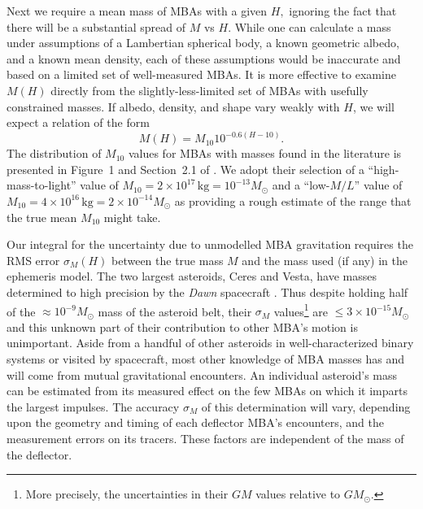 \documentclass[linenumbers, onecolumn]{aastex631}
\newcommand\edited[1]{{\color{red} {#1}}}
\begin{document}
\edited{Next we require a mean mass of MBAs with a given $H,$ ignoring the fact
  that there will be a substantial spread of $M$ vs $H$.  While one can
  calculate a mass under assumptions of a Lambertian spherical body, a known
  geometric albedo, and a known mean density, each of these assumptions would be
  inaccurate and based on a limited set of well-measured MBAs.  It is more
  effective to examine $M(H)$ directly from the slightly-less-limited set of
  MBAs with usefully constrained masses.  If albedo, density, and shape vary
  weakly with $H$, we will expect a relation of the form
  \begin{equation}
        M(H) = M_{10} 10^{-0.6(H-10)}.
        \label{m10}
      \end{equation}
The distribution of $M_{10}$ values for MBAs with masses found in the literature
is presented in Figure~1 and Section~2.1 of \citet{negin}.  We adopt their
selection of a ``high-mass-to-light'' value of
$M_{10}=2\times10^{17}\,\text{kg}=10^{-13} M_\odot$ and a ``low-$M/L$'' value of
$M_{10}=4\times10^{16}\,\text{kg}=2\times10^{-14} M_\odot$ as providing a rough
estimate of the range that the true mean $M_{10}$ might take.}

Our integral for the uncertainty due to unmodelled MBA gravitation
requires the RMS error $\sigma_M(H)$ between the true mass $M$ and the
mass used (if any) in the ephemeris model.
The two largest asteroids, Ceres and Vesta, have masses determined to
high precision by the \textit{Dawn} spacecraft \citep{Ceres,Vesta}.  Thus despite holding
half of the $\approx 10^{-9} M_\odot$ mass of the asteroid belt, their $\sigma_M$
values\footnote{More precisely, the uncertainties in their $GM$ values
  relative to $GM_\odot$.} are 
$\le3\times10^{-15} M_\odot$ and
this unknown part of their contribution to other MBA's motion is 
unimportant.  Aside from a handful of other asteroids in
well-characterized binary systems or visited by spacecraft, most other knowledge of MBA masses
has and will come from mutual gravitational encounters.   An
individual asteroid's mass can be estimated from its measured effect  on the
few MBAs on which it imparts the largest impulses.  The accuracy
$\sigma_M$ of this determination will vary, depending upon the
geometry  and timing of
each deflector MBA's encounters, and the measurement errors on its tracers.  These
factors are independent of the mass of the deflector.
\end{document}
